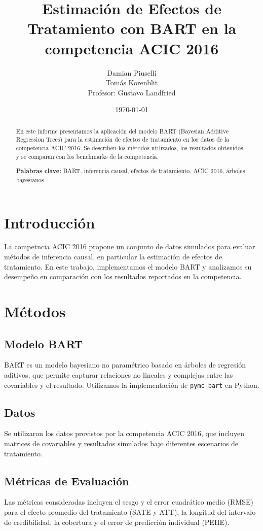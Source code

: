 \documentclass[a4paper,12pt]{article}
\title{Estimación de Efectos de Tratamiento con BART en la competencia ACIC 2016}
\author{Damian Piuselli \\ Tomás Korenblit \\ Profesor: Gustavo Landfried}
\date{\today}
\begin{document}
\maketitle

\begin{abstract}
En este informe presentamos la aplicación del modelo BART (Bayesian Additive Regression Trees) para la estimación de efectos de tratamiento en los datos de la competencia ACIC 2016. Se describen los métodos utilizados, los resultados obtenidos y se comparan con los benchmarks de la competencia.

\noindent\textbf{Palabras clave:} BART, inferencia causal, efectos de tratamiento, ACIC 2016, árboles bayesianos
\end{abstract}

\section{Introducción}
La competncia ACIC 2016 propone un conjunto de datos simulados para evaluar métodos de inferencia causal, en particular la estimación de efectos de tratamiento. En este trabajo, implementamos el modelo BART y analizamos su desempeño en comparación con los resultados reportados en la competencia.

\section{Métodos}
\subsection{Modelo BART}
BART es un modelo bayesiano no paramétrico basado en árboles de regresión aditivos, que permite capturar relaciones no lineales y complejas entre las covariables y el resultado. Utilizamos la implementación de \texttt{pymc-bart} en Python.

\subsection{Datos}
Se utilizaron los datos provistos por la competencia ACIC 2016, que incluyen matrices de covariables y resultados simulados bajo diferentes escenarios de tratamiento.

\subsection{Métricas de Evaluación}
Las métricas consideradas incluyen el sesgo y el error cuadrático medio (RMSE) para el efecto promedio del tratamiento (SATE y ATT), la longitud del intervalo de credibilidad, la cobertura y el error de predicción individual (PEHE).
\end{document}
